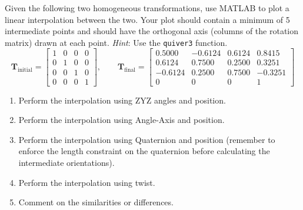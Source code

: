 \documentclass[11pt]{article}
\newcommand{\T}{\bm{T}}
\begin{document}
\begin{statement}
Given the following two homogeneous transformations, use MATLAB to plot a linear interpolation between the two. Your plot should contain a minimum of 5 intermediate points and should have the orthogonal axis (columns of the rotation matrix) drawn at each point. \textit{Hint}: Use the \verb|quiver3| function.
\[
    \T_{\text{initial}} = \begin{bmatrix}
        1 & 0 & 0 & 0\\
        0 & 1 & 0 & 0\\
        0 & 0 & 1 & 0\\
        0 & 0 & 0 & 1
    \end{bmatrix},\qquad
    \T_{\text{final}} = \begin{bmatrix}
        0.5000 & -0.6124 & 0.6124 & 0.8415\\
        0.6124 & 0.7500 & 0.2500 & 0.3251\\
        -0.6124 & 0.2500 & 0.7500 & -0.3251\\
        0 & 0 & 0 & 1
    \end{bmatrix}
\]
\begin{enumerate}[label=(\alph*), leftmargin=1.6em, itemsep=2pt]
    \item Perform the interpolation using ZYZ angles and position.
    \item Perform the interpolation using Angle-Axis and position.
    \item Perform the interpolation using Quaternion and position (remember to enforce the length constraint on the quaternion before calculating the intermediate orientations).
    \item Perform the interpolation using twist.
    \item Comment on the similarities or differences.
\end{enumerate}
\end{statement}
\end{document}
